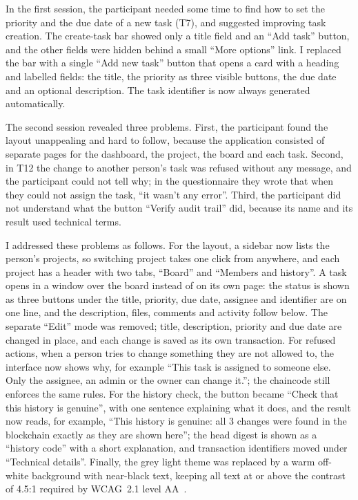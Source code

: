 In the first session, the participant needed some time to find how to set the priority and the due date of a new task (T7), and suggested improving task creation. The create-task bar showed only a title field and an ``Add task'' button, and the other fields were hidden behind a small ``More options'' link. I replaced the bar with a single ``Add new task'' button that opens a card with a heading and labelled fields: the title, the priority as three visible buttons, the due date and an optional description. The task identifier is now always generated automatically.

The second session revealed three problems. First, the participant found the layout unappealing and hard to follow, because the application consisted of separate pages for the dashboard, the project, the board and each task. Second, in T12 the change to another person's task was refused without any message, and the participant could not tell why; in the questionnaire they wrote that when they could not assign the task, ``it wasn't any error''. Third, the participant did not understand what the button ``Verify audit trail'' did, because its name and its result used technical terms.

I addressed these problems as follows. For the layout, a sidebar now lists the person's projects, so switching project takes one click from anywhere, and each project has a header with two tabs, ``Board'' and ``Members and history''. A task opens in a window over the board instead of on its own page: the status is shown as three buttons under the title, priority, due date, assignee and identifier are on one line, and the description, files, comments and activity follow below. The separate ``Edit'' mode was removed; title, description, priority and due date are changed in place, and each change is saved as its own transaction. For refused actions, when a person tries to change something they are not allowed to, the interface now shows why, for example ``This task is assigned to someone else. Only the assignee, an admin or the owner can change it.''; the chaincode still enforces the same rules. For the history check, the button became ``Check that this history is genuine'', with one sentence explaining what it does, and the result now reads, for example, ``This history is genuine: all 3 changes were found in the blockchain exactly as they are shown here''; the head digest is shown as a ``history code'' with a short explanation, and transaction identifiers moved under ``Technical details''. Finally, the grey light theme was replaced by a warm off-white background with near-black text, keeping all text at or above the contrast of 4.5:1 required by WCAG~2.1 level AA~\cite{wcag21}.

